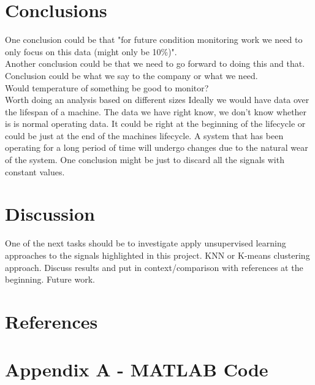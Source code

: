 \documentclass{article}
\begin{document}
\clearpage 
\section{Conclusions}
One conclusion could be that "for future condition monitoring work we need to only focus on this data (might only be 10\%)".\\
Another conclusion could be that we need to go forward to doing this and that.\\
Conclusion could be what we say to the company or what we need.\\
Would temperature of something be good to monitor?\\
Worth doing an analysis based on different sizes
Ideally we would have data over the lifespan of a machine. The data we have right know, we don't know whether is is normal operating data. It could be right at the beginning of the lifecycle or could be just at the end of the machines lifecycle. A system that has been operating for a long period of time will undergo changes due to the natural wear of the system.
One conclusion might be just to discard all the signals with constant values.
\newpage
\section{Discussion} 
One of the next tasks should be to investigate apply unsupervised learning approaches to the signals highlighted in this project.
KNN or
K-means clustering approach.
Discuss results and put in context/comparison with references at the beginning. Future work.
\clearpage
\section{References} 
\printbibliography[heading=none] 
\clearpage  
\section{Appendix A - MATLAB Code}
\UseRawInputEncoding


%
\end{document}
